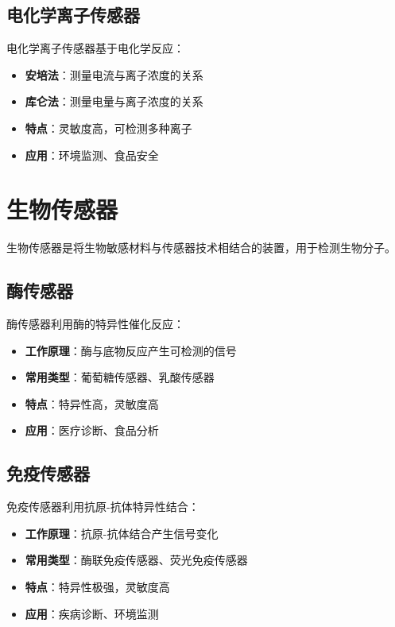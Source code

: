 \documentclass[12pt,UTF8]{ctexbook}
\begin{document}
\subsection{电化学离子传感器}

电化学离子传感器基于电化学反应：

\begin{itemize}[leftmargin=2cm]
	\item \textbf{安培法}：测量电流与离子浓度的关系
	\item \textbf{库仑法}：测量电量与离子浓度的关系
	\item \textbf{特点}：灵敏度高，可检测多种离子
	\item \textbf{应用}：环境监测、食品安全
\end{itemize}

\section{生物传感器}

生物传感器是将生物敏感材料与传感器技术相结合的装置，用于检测生物分子。

\subsection{酶传感器}

酶传感器利用酶的特异性催化反应：

\begin{itemize}[leftmargin=2cm]
	\item \textbf{工作原理}：酶与底物反应产生可检测的信号
	\item \textbf{常用类型}：葡萄糖传感器、乳酸传感器
	\item \textbf{特点}：特异性高，灵敏度高
	\item \textbf{应用}：医疗诊断、食品分析
\end{itemize}

\subsection{免疫传感器}

免疫传感器利用抗原-抗体特异性结合：

\begin{itemize}[leftmargin=2cm]
	\item \textbf{工作原理}：抗原-抗体结合产生信号变化
	\item \textbf{常用类型}：酶联免疫传感器、荧光免疫传感器
	\item \textbf{特点}：特异性极强，灵敏度高
	\item \textbf{应用}：疾病诊断、环境监测
\end{itemize}
\end{document}
